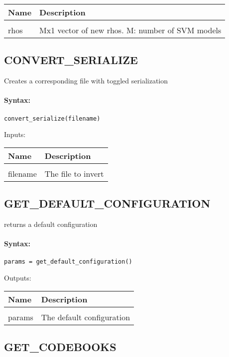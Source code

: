 \begin{tabular}{|l|p{5cm}|}
\hline
\textbf{Name} & \textbf{Description} \\
\hline \hline \\
rhos & Mx1 vector of new rhos. M: number of SVM models  \\ \hline
\end{tabular}

\subsection{CONVERT\_SERIALIZE}

Creates a corresponding file with toggled serialization

\paragraph{Syntax:} \verb|convert_serialize(filename)|

Inputs:

\begin{tabular}{|l|p{5cm}|}
\hline
\textbf{Name} & \textbf{Description} \\
\hline \hline \\
filename & The file to invert  \\ \hline
\end{tabular}

\subsection{GET\_DEFAULT\_CONFIGURATION}

returns a default configuration

\paragraph{Syntax:} \verb|params = get_default_configuration()|

Outputs:

\begin{tabular}{|l|p{5cm}|}
\hline
\textbf{Name} & \textbf{Description} \\
\hline \hline \\
params & The default configuration  \\ \hline
\end{tabular}

\subsection{GET\_CODEBOOKS}


